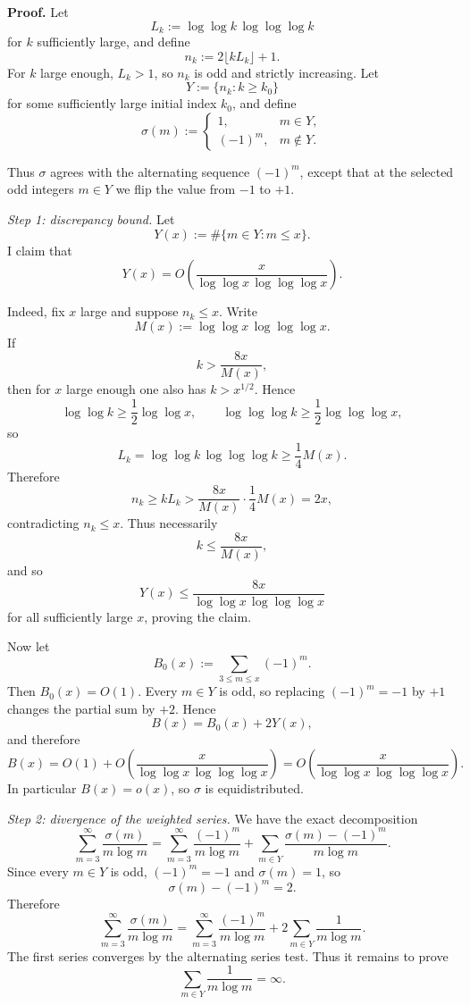 \textbf{Proof.}
Let
\[
L_k:=\log\log k\,\log\log\log k
\]
for \(k\) sufficiently large, and define
\[
n_k:=2\lfloor kL_k\rfloor+1.
\]
For \(k\) large enough, \(L_k>1\), so \(n_k\) is odd and strictly increasing.
Let
\[
Y:=\{n_k: k\ge k_0\}
\]
for some sufficiently large initial index \(k_0\), and define
\[
\sigma(m):=
\begin{cases}
1, & m\in Y,\\
(-1)^m, & m\notin Y.
\end{cases}
\]

Thus \(\sigma\) agrees with the alternating sequence \((-1)^m\), except that at the selected odd integers \(m\in Y\) we flip the value from \(-1\) to \(+1\).

\medskip

\emph{Step 1: discrepancy bound.}
Let
\[
Y(x):=\#\{m\in Y: m\le x\}.
\]
I claim that
\[
Y(x)=O\!\left(\frac{x}{\log\log x\,\log\log\log x}\right).
\]

Indeed, fix \(x\) large and suppose \(n_k\le x\).
Write
\[
M(x):=\log\log x\,\log\log\log x.
\]
If
\[
k>\frac{8x}{M(x)},
\]
then for \(x\) large enough one also has \(k>x^{1/2}\).
Hence
\[
\log\log k \ge \frac12 \log\log x,
\qquad
\log\log\log k \ge \frac12 \log\log\log x,
\]
so
\[
L_k=\log\log k\,\log\log\log k
\ge \frac14 M(x).
\]
Therefore
\[
n_k \ge kL_k
>
\frac{8x}{M(x)}\cdot \frac14 M(x)
=
2x,
\]
contradicting \(n_k\le x\).
Thus necessarily
\[
k\le \frac{8x}{M(x)},
\]
and so
\[
Y(x)\le \frac{8x}{\log\log x\,\log\log\log x}
\]
for all sufficiently large \(x\), proving the claim.

Now let
\[
B_0(x):=\sum_{3\le m\le x} (-1)^m.
\]
Then \(B_0(x)=O(1)\).
Every \(m\in Y\) is odd, so replacing \((-1)^m=-1\) by \(+1\) changes the partial sum by \(+2\).
Hence
\[
B(x)=B_0(x)+2Y(x),
\]
and therefore
\[
B(x)=O(1)+O\!\left(\frac{x}{\log\log x\,\log\log\log x}\right)
=
O\!\left(\frac{x}{\log\log x\,\log\log\log x}\right).
\]
In particular \(B(x)=o(x)\), so \(\sigma\) is equidistributed.

\medskip

\emph{Step 2: divergence of the weighted series.}
We have the exact decomposition
\[
\sum_{m=3}^\infty \frac{\sigma(m)}{m\log m}
=
\sum_{m=3}^\infty \frac{(-1)^m}{m\log m}
+
\sum_{m\in Y} \frac{\sigma(m)-(-1)^m}{m\log m}.
\]
Since every \(m\in Y\) is odd, \((-1)^m=-1\) and \(\sigma(m)=1\), so
\[
\sigma(m)-(-1)^m=2.
\]
Therefore
\[
\sum_{m=3}^\infty \frac{\sigma(m)}{m\log m}
=
\sum_{m=3}^\infty \frac{(-1)^m}{m\log m}
+
2\sum_{m\in Y}\frac{1}{m\log m}.
\]
The first series converges by the alternating series test.
Thus it remains to prove
\[
\sum_{m\in Y}\frac{1}{m\log m}=\infty.
\]

